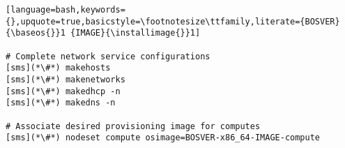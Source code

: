 \begin{lstlisting}[language=bash,keywords={},upquote=true,basicstyle=\footnotesize\ttfamily,literate={BOSVER}{\baseos{}}1 {IMAGE}{\installimage{}}1]

# Complete network service configurations
[sms](*\#*) makehosts
[sms](*\#*) makenetworks
[sms](*\#*) makedhcp -n
[sms](*\#*) makedns -n

# Associate desired provisioning image for computes
[sms](*\#*) nodeset compute osimage=BOSVER-x86_64-IMAGE-compute
\end{lstlisting}


